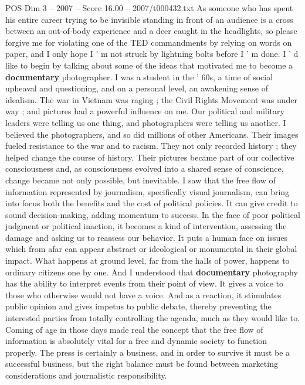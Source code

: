 \begin{textsample}{POS Dim 3 – 2007 – Score 16.00 – 2007/t000432.txt}  \label{ex:f3_pos_041}
As someone who has spent his entire career trying to be invisible standing in front of an audience is a cross between an out-of-body experience and a deer caught in the headlights, so please forgive me for violating one of the TED commandments by relying on words on paper, and I only hope I ' m not struck by lightning bolts before I ' m done.
I ' d like to begin by talking about some of the ideas that motivated me to become a \textbf{documentary} photographer.
I was a student in the ' 60s, a time of social upheaval and questioning, and on a personal level, an awakening sense of idealism.
The war in Vietnam was raging ; the Civil Rights Movement was under way ; and pictures had a powerful influence on me.
Our political and military leaders were telling us one thing, and photographers were telling us another.
I believed the photographers, and so did millions of other Americans.
Their images fueled resistance to the war and to racism.
They not only recorded history ; they helped change the course of history.
Their pictures became part of our collective consciousness and, as consciousness evolved into a shared sense of conscience, change became not only possible, but inevitable.
I saw that the free flow of information represented by journalism, specifically visual journalism, can bring into focus both the benefits and the cost of political policies.
It can give credit to sound decision-making, adding momentum to success.
In the face of poor political judgment or political inaction, it becomes a kind of intervention, assessing the damage and asking us to reassess our behavior.
It puts a human face on issues which from afar can appear abstract or ideological or monumental in their global impact.
What happens at ground level, far from the halls of power, happens to ordinary citizens one by one.
And I understood that \textbf{documentary} photography has the ability to interpret events from their point of view.
It gives a voice to those who otherwise would not have a voice.
And as a reaction, it stimulates public opinion and gives impetus to public debate, thereby preventing the interested parties from totally controlling the agenda, much as they would like to.
Coming of age in those days made real the concept that the free flow of information is absolutely vital for a free and dynamic society to function properly.
The press is certainly a business, and in order to survive it must be a successful business, but the right balance must be found between marketing considerations and journalistic responsibility.

\end{textsample}
